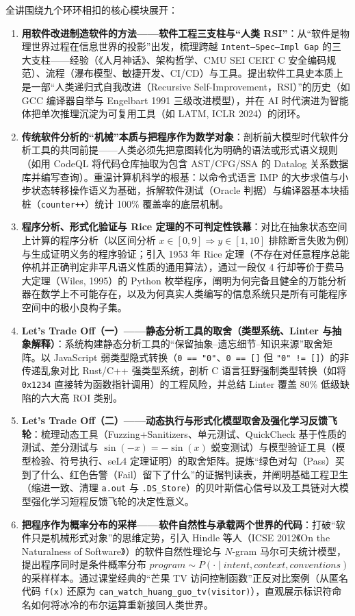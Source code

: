\documentclass[a4paper]{article}
\begin{document}
全讲围绕九个环环相扣的核心模块展开：
\begin{enumerate}
    \item \textbf{用软件改进制造软件的方法——软件工程三支柱与“人类 RSI”}：从“软件是物理世界过程在信息世界的投影”出发，梳理跨越 \texttt{Intent--Spec--Impl Gap} 的三大支柱——经验（《人月神话》、架构哲学、CMU SEI CERT C 安全编码规范）、流程（瀑布模型、敏捷开发、CI/CD）与工具。提出软件工具史本质上是一部“人类递归式自我改进（Recursive Self-Improvement，RSI）”的历史（如 GCC 编译器自举与 Engelbart 1991 三级改进模型），并在 AI 时代演进为智能体把单次推理沉淀为可复用工具（如 LATM, ICLR 2024）的闭环。
    \item \textbf{传统软件分析的“机械”本质与把程序作为数学对象}：剖析前大模型时代软件分析工具的共同前提——人类必须先把意图转化为明确的语法或形式语义规则（如用 CodeQL 将代码仓库抽取为包含 AST/CFG/SSA 的 Datalog 关系数据库并编写查询）。重温计算机科学的根基：以命令式语言 IMP 的大步求值与小步状态转移操作语义为基础，拆解软件测试（Oracle 判据）与编译器基本块插桩（\texttt{counter++}）统计 100\% 覆盖率的底层机制。
    \item \textbf{程序分析、形式化验证与 Rice 定理的不可判定性铁幕}：对比在抽象状态空间上计算的程序分析（以区间分析 $x \in [0,9] \Rightarrow y \in [1,10]$ 排除断言失败为例）与生成证明义务的程序验证；引入 1953 年 Rice 定理（不存在对任意程序总能停机并正确判定非平凡语义性质的通用算法），通过一段仅 4 行却等价于费马大定理（Wiles, 1995）的 Python 枚举程序，阐明为何完备且健全的万能分析器在数学上不可能存在，以及为何真实人类编写的信息系统只是所有可能程序空间中的极小良构子集。
    \item \textbf{Let's Trade Off（一）——静态分析工具的取舍（类型系统、Linter 与抽象解释）}：系统构建静态分析工具的“保留抽象--遗忘细节--知识来源”取舍矩阵。以 JavaScript 弱类型隐式转换（\texttt{0 == "0"}、\texttt{0 == []} 但 \texttt{"0" != []}）的非传递乱象对比 Rust/C++ 强类型系统，剖析 C 语言狂野强制类型转换（如将 \texttt{0x1234} 直接转为函数指针调用）的工程风险，并总结 Linter 覆盖 80\% 低级缺陷的六大高 ROI 类别。
    \item \textbf{Let's Trade Off（二）——动态执行与形式化模型取舍及强化学习反馈飞轮}：梳理动态工具（Fuzzing+Sanitizers、单元测试、QuickCheck 基于性质的测试、差分测试与 $\sin(-x) = -\sin(x)$ 蜕变测试）与模型验证工具（模型检验、符号执行、seL4 定理证明）的取舍矩阵。提炼“绿色对勾（Pass）买到了什么、红色告警（Fail）留下了什么”的证据判读表，并阐明基础工程卫生（缩进一致、清理 \texttt{a.out} 与 \texttt{.DS\_Store}）的贝叶斯信心信号以及工具链对大模型强化学习短程反馈飞轮的决定性意义。
    \item \textbf{把程序作为概率分布的采样——软件自然性与承载两个世界的代码}：打破“软件只是机械形式对象”的思维定势，引入 Hindle 等人（ICSE 2012《On the Naturalness of Software》）的软件自然性理论与 $N$-gram 马尔可夫统计模型，提出程序同时是条件概率分布 $\mathit{program} \sim P(\cdot \mid \mathit{intent}, \mathit{context}, \mathit{conventions})$ 的采样样本。通过课堂经典的“芒果 TV 访问控制函数”正反对比案例（从匿名代码 \texttt{f(x)} 还原为 \texttt{can\_watch\_huang\_guo\_tv(visitor)}），直观展示标识符命名如何将冰冷的布尔运算重新接回人类世界。

\end{enumerate}
\end{document}
